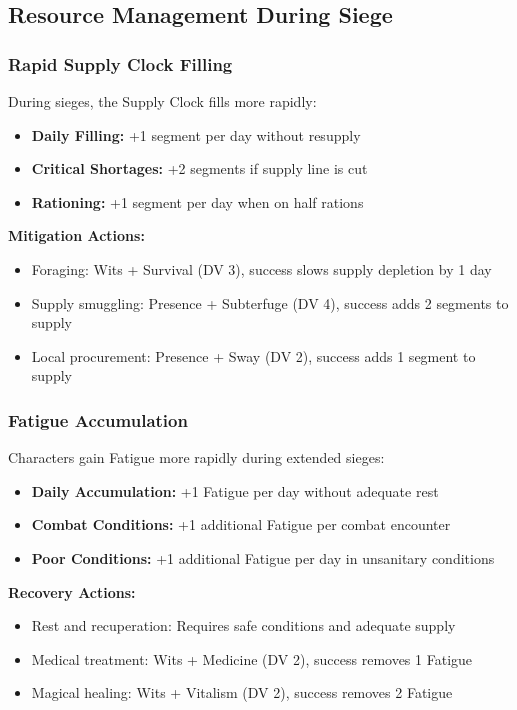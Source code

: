 \documentclass[11pt,letterpaper]{article}
\begin{document}
\subsection{Resource Management During Siege}

\subsubsection{Rapid Supply Clock Filling}

During sieges, the Supply Clock fills more rapidly:
\begin{itemize}[leftmargin=*]
    \item \textbf{Daily Filling:} +1 segment per day without resupply
    \item \textbf{Critical Shortages:} +2 segments if supply line is cut
    \item \textbf{Rationing:} +1 segment per day when on half rations
\end{itemize}

\textbf{Mitigation Actions:}
\begin{itemize}[leftmargin=*]
    \item Foraging: Wits + Survival (DV 3), success slows supply depletion by 1 day
    \item Supply smuggling: Presence + Subterfuge (DV 4), success adds 2 segments to supply
    \item Local procurement: Presence + Sway (DV 2), success adds 1 segment to supply
\end{itemize}

\subsubsection{Fatigue Accumulation}

Characters gain Fatigue more rapidly during extended sieges:
\begin{itemize}[leftmargin=*]
    \item \textbf{Daily Accumulation:} +1 Fatigue per day without adequate rest
    \item \textbf{Combat Conditions:} +1 additional Fatigue per combat encounter
    \item \textbf{Poor Conditions:} +1 additional Fatigue per day in unsanitary conditions
\end{itemize}

\textbf{Recovery Actions:}
\begin{itemize}[leftmargin=*]
    \item Rest and recuperation: Requires safe conditions and adequate supply
    \item Medical treatment: Wits + Medicine (DV 2), success removes 1 Fatigue
    \item Magical healing: Wits + Vitalism (DV 2), success removes 2 Fatigue
\end{itemize}
\end{document}
